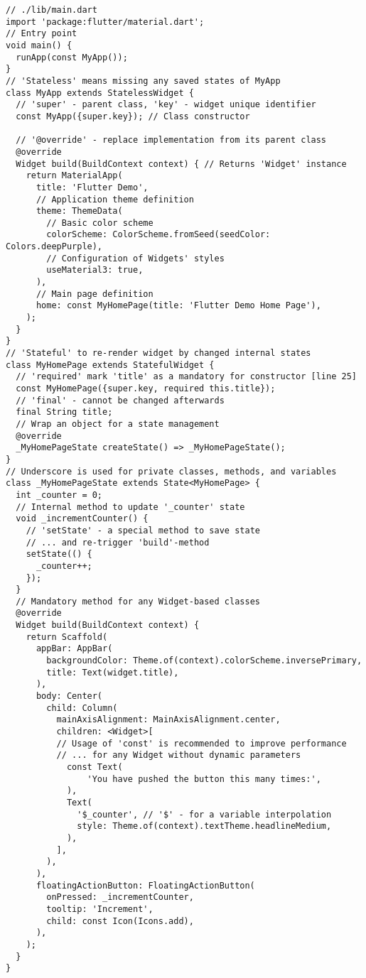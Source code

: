 \begin{lstlisting}
// ./lib/main.dart
import 'package:flutter/material.dart';
// Entry point
void main() {
  runApp(const MyApp());
}
// 'Stateless' means missing any saved states of MyApp
class MyApp extends StatelessWidget {
  // 'super' - parent class, 'key' - widget unique identifier
  const MyApp({super.key}); // Class constructor
  
  // '@override' - replace implementation from its parent class
  @override
  Widget build(BuildContext context) { // Returns 'Widget' instance
    return MaterialApp(
      title: 'Flutter Demo',
      // Application theme definition
      theme: ThemeData(
        // Basic color scheme
        colorScheme: ColorScheme.fromSeed(seedColor: Colors.deepPurple),
        // Configuration of Widgets' styles
        useMaterial3: true,
      ),
      // Main page definition
      home: const MyHomePage(title: 'Flutter Demo Home Page'),
    );
  }
}
// 'Stateful' to re-render widget by changed internal states
class MyHomePage extends StatefulWidget {
  // 'required' mark 'title' as a mandatory for constructor [line 25]
  const MyHomePage({super.key, required this.title});
  // 'final' - cannot be changed afterwards
  final String title;
  // Wrap an object for a state management
  @override
  _MyHomePageState createState() => _MyHomePageState();
}
// Underscore is used for private classes, methods, and variables
class _MyHomePageState extends State<MyHomePage> {
  int _counter = 0;
  // Internal method to update '_counter' state
  void _incrementCounter() {
    // 'setState' - a special method to save state
    // ... and re-trigger 'build'-method
    setState(() {
      _counter++;
    });
  }
  // Mandatory method for any Widget-based classes
  @override
  Widget build(BuildContext context) {
    return Scaffold(
      appBar: AppBar(
        backgroundColor: Theme.of(context).colorScheme.inversePrimary,
        title: Text(widget.title),
      ),
      body: Center(
        child: Column(
          mainAxisAlignment: MainAxisAlignment.center,
          children: <Widget>[
          // Usage of 'const' is recommended to improve performance
          // ... for any Widget without dynamic parameters
            const Text(
                'You have pushed the button this many times:',
            ),
            Text(
              '$_counter', // '$' - for a variable interpolation
              style: Theme.of(context).textTheme.headlineMedium,
            ),
          ],
        ),
      ),
      floatingActionButton: FloatingActionButton(
        onPressed: _incrementCounter,
        tooltip: 'Increment',
        child: const Icon(Icons.add),
      ),
    );
  }
}
\end{lstlisting}

